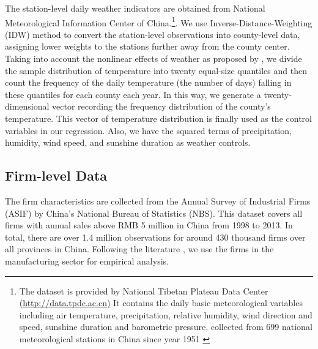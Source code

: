 \documentclass[12pt]{article}
\begin{document}
The station-level daily weather indicators are obtained from National
Meteorological Information Center of China.\footnote{The dataset is provided by National Tibetan Plateau Data Center \url{(http://data.tpdc.ac.cn)} It contains the daily basic meteorological
variables including air temperature, precipitation,
relative humidity, wind direction and speed, sunshine duration
and barometric pressure, collected from 699 national meteorological stations in China
since year 1951 \citep{Dailymeteorologicaldataset}}. We use
Inverse-Distance-Weighting (IDW) method to convert the station-level observations into county-level data, assigning lower weights to the stations further away from the
county center. Taking into account the nonlinear effects of weather as proposed by \citep{deschenes2017defensive}, we divide the sample distribution of temperature into twenty equal-size quantiles and then count the frequency of the daily temperature (the number of days) falling in these quantiles for each county each year. In this way, we generate a twenty-dimensional vector recording the frequency distribution of the county's temperature. This vector of temperature distribution is finally used as the control variables in our regression. Also, we have the squared terms of precipitation, humidity, wind speed, and sunshine duration as weather controls. 

\subsection{Firm-level Data} \label{sec:data_firm}
The firm characteristics are collected from the Annual Survey of Industrial Firms (ASIF) by China's National Bureau of Statistics (NBS). This dataset covers all firms with annual sales
above RMB 5 million in China from 1998 to 2013. In total, there are over 1.4 million observations for around 430 thousand firms over all provinces in
China. Following the literature \citep[e.g.,][]{fu2021trans}, we use the firms in the manufacturing sector for empirical analysis. 
\end{document}
